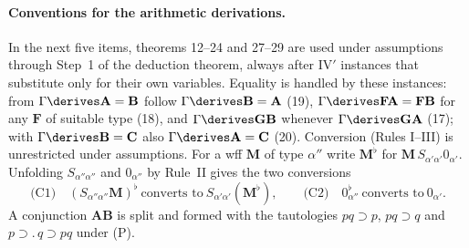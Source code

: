 \paragraph{Conventions for the arithmetic derivations.}  In the next five
items, theorems 12--24 and 27--29 are used under assumptions through Step~1
of the deduction theorem, always after IV\('\) instances that substitute only
for their own variables.  Equality is handled by these instances:
from \(\Gamma\derives\mathbf A=\mathbf B\) follow
\(\Gamma\derives\mathbf B=\mathbf A\) (19),
\(\Gamma\derives\mathbf F\mathbf A=\mathbf F\mathbf B\) for any \(\mathbf F\) of
suitable type (18), and \(\Gamma\derives\mathbf G\mathbf B\) whenever
\(\Gamma\derives\mathbf G\mathbf A\) (17); with
\(\Gamma\derives\mathbf B=\mathbf C\) also \(\Gamma\derives\mathbf A=\mathbf C\)
(20).  Conversion (Rules I--III) is unrestricted under assumptions.  For a wff
\(\mathbf M\) of type \(\alpha''\) write
\(\mathbf M^\flat\) for \(\mathbf M\,S_{\alpha'\alpha'}0_{\alpha'}\).  Unfolding
\(S_{\alpha''\alpha''}\) and \(0_{\alpha''}\) by Rule~II gives the two
conversions
\[
 \text{(C1)}\quad(S_{\alpha''\alpha''}\mathbf M)^\flat\ \text{converts to}\
 S_{\alpha'\alpha'}(\mathbf M^\flat),\qquad
 \text{(C2)}\quad0_{\alpha''}^\flat\ \text{converts to}\ 0_{\alpha'}.
\]
A conjunction \(\mathbf A\mathbf B\) is split and formed with the tautologies
\(pq\supset p\), \(pq\supset q\) and \(p\supset.\,q\supset pq\) under (P).

